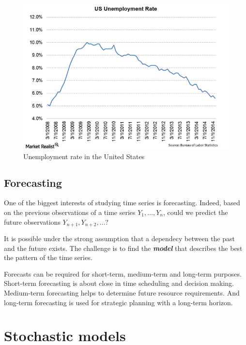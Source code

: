 \documentclass[11pt,a4paper,oneside]{book}
\begin{document}
\begin{figure}[ht]
  \centering
    \includegraphics[scale=0.5]{img/Unemployment-Rate.png}
  \caption{Unemployment rate in the United States}
  \label{fig:US}
\end{figure}



\subsection{Forecasting}

One of the biggest interests of studying time series is forecasting. Indeed, based on the previous observations of a time series $Y_{1},...,Y_{n}$, could we predict the future observations  $Y_{n+1}, Y_{n+2},...$? 

It is possible under the strong assumption that a dependecy between the past and the future exists. The challenge is to find the \textit{\textbf{model}} that describes the best the pattern of the time series.

Forecasts can be required for short-term, medium-term and long-term purposes. Short-term forecasting is about close in time scheduling and decision making. Medium-term forecasting helps to determine future resource requirements. And long-term forecasting is used for strategic planning with a long-term horizon. \cite{hyndman}





\section{Stochastic models}
\end{document}
